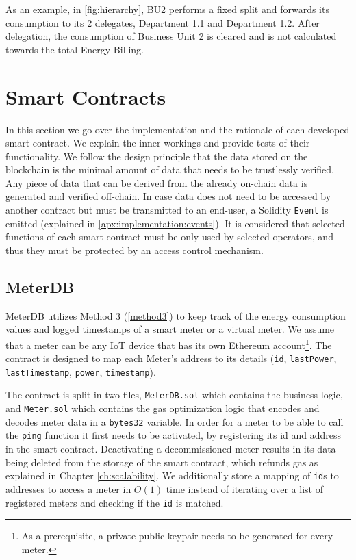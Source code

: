 
As an example, in \ref{fig:hierarchy}, BU2 performs a fixed split and forwards its consumption to its 2 delegates, Department 1.1 and Department 1.2. After delegation, the consumption of Business Unit 2 is cleared and is not calculated towards the total Energy Billing.

\section{Smart Contracts} \label{ch:implementation:sc}
In this section we go over the implementation and the rationale of each developed smart contract. We explain the inner workings and provide tests of their functionality. We follow the design principle that the data stored on the blockchain is the minimal amount of data that needs to be trustlessly verified. Any piece of data that can be derived from the already on-chain data is generated and verified off-chain. In case data does not need to be accessed by another contract but must be transmitted to an end-user, a Solidity \texttt{Event} is emitted (explained in \ref{apx:implementation:events}). It is considered that selected functions of each smart contract must be only used by selected operators, and thus they must be protected by an access control mechanism.

\subsection{MeterDB}
MeterDB utilizes Method 3 (\ref{method3}) to keep track of the energy consumption values and logged timestamps of a smart meter or a virtual meter. We assume that a meter can be any IoT device that has its own Ethereum account\footnote{As a prerequisite, a private-public keypair needs to be generated for every meter.}. The contract is designed to map each Meter's address to its details (\texttt{id}, \texttt{lastPower}, \texttt{lastTimestamp}, \texttt{power}, \texttt{timestamp}).

The contract is split in two files, \texttt{MeterDB.sol} which contains the business logic, and \texttt{Meter.sol} which contains the gas optimization logic that encodes and decodes meter data in a \texttt{bytes32} variable. In order for a meter to be able to call the \texttt{ping} function it first needs to be activated, by registering its id and address in the smart contract. Deactivating a decommissioned meter results in its data being deleted from the storage of the smart contract, which refunds gas as explained in Chapter \ref{ch:scalability}. We additionally store a mapping of \texttt{id}s to addresses to access a meter in $O(1)$ time instead of iterating over a list of registered meters and checking if the \texttt{id} is matched.

